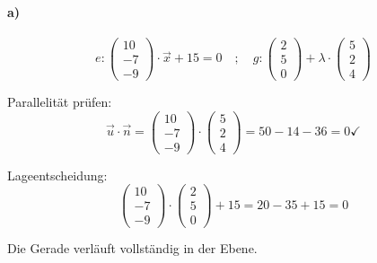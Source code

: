 \documentclass{ajc}
\numberwithin{equation}{subsection}
\begin{document}
	\paragraph{a)}
	\begin{equation}
		e: \left(\begin{array}{r} 10 \\ -7 \\ -9\end{array}\right) \cdot \vec{x} + 15 = 0 \quad ; \quad g: \left(\begin{array}{r} 2 \\ 5 \\ 0\end{array}\right) + \lambda \cdot \left(\begin{array}{r} 5 \\ 2 \\ 4\end{array}\right)
	\end{equation}
	
	Parallelität prüfen:
	\begin{equation}
		\vec{u} \cdot \vec{n} = \left(\begin{array}{r} 10 \\ -7 \\ -9\end{array}\right) \cdot \left(\begin{array}{r} 5 \\ 2 \\ 4\end{array}\right) = 50 - 14 - 36 = 0 \checkmark
	\end{equation}
	
	Lageentscheidung:
	\begin{equation}
		\left(\begin{array}{r} 10 \\ -7 \\ -9\end{array}\right) \cdot \left(\begin{array}{r} 2 \\ 5 \\ 0\end{array}\right) + 15 = 20 - 35 + 15 = 0
	\end{equation}
	
	Die Gerade verläuft vollständig in der Ebene.
	
\end{document}
